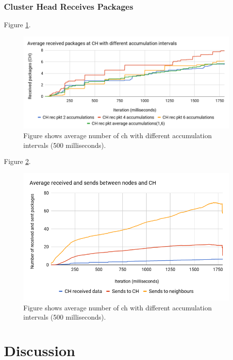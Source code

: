 \documentclass[USenglish]{uit-thesis}
\begin{document}
\subsection{Cluster Head Receives Packages}


Figure \ref{fig:recPktChart}.

\begin{figure}
\centering
\includegraphics[width=\textwidth]{recPktChart.png}
\caption{Figure shows average number of \gls{ch} with different accumulation intervals (500 milliseconds).}
\label{fig:recPktChart}
\end{figure}




Figure \ref{fig:sentvsrecvChart}.

\begin{figure}
\centering
\includegraphics[width=\textwidth]{sentVsRecvChart.png}
\caption{Figure shows average number of \gls{ch} with different accumulation intervals (500 milliseconds).}
\label{fig:sentvsrecvChart}
\end{figure}


\chapter{Discussion}
\end{document}
